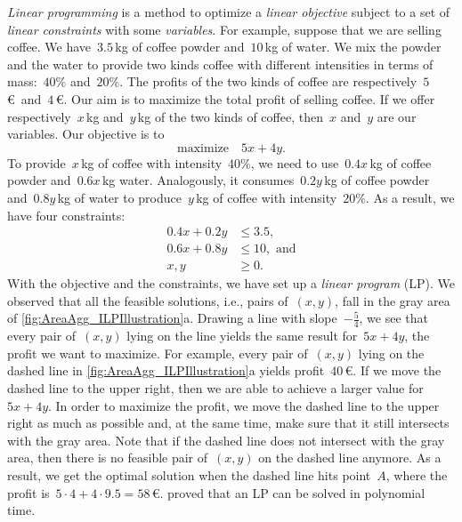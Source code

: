 \emph{Linear programming} is a method 
to optimize a \emph{linear objective}
subject to a set of \emph{linear constraints}
with some \emph{variables}.
For example, suppose that we are selling coffee.
We have~$3.5\,$kg of coffee powder and~$10\,$kg of water.
We mix the powder and the water to provide two kinds coffee 
with different intensities in terms of mass:~$40\%$ and~$20\%$.
The profits of the two kinds of coffee 
are respectively~$5\,$\euro~and~$4\,$\euro.
Our aim is to maximize the total profit of selling coffee.
If we offer respectively~$x\,$kg and~$y\,$kg 
of the two kinds of coffee,
then~$x$ and~$y$ are our variables.
Our objective is to
$$
\mathrm{maximize} 	\quad	 5x+4y.
$$
To provide~$x\,$kg of coffee with intensity~$40\%$,
we need to use~$0.4x\,$kg of coffee powder 
and~$0.6x\,$kg water.
Analogously, it consumes~$0.2y\,$kg of coffee powder 
and~$0.8y\,$kg of water to produce~$y\,$kg of coffee
with intensity~$20\%$.
As a result, we have four constraints:
\begin{align*}
0.4x+0.2y	&\le 3.5,				\\
0.6x+0.8y 	&\le 10,	\text{~and}			\\
x,y			&\ge 0.
\end{align*}
With the objective and the constraints, 
we have set up a \emph{linear program} (LP).
We observed that 
all the feasible solutions, i.e., pairs of~$(x,y)$,
fall in the gray area of
\fig\ref{fig:AreaAgg_ILPIllustration}a.
Drawing a line with slope~$-\frac{5}{4}$,
we see that every pair of~$(x,y)$ lying on the line
yields the same result for~$5x+4y$, 
the profit we want to maximize.
For example, every pair of~$(x,y)$ lying on the dashed line
in \fig\ref{fig:AreaAgg_ILPIllustration}a 
yields profit~$40\,$\euro.
If we move the dashed line to the upper right,
then we are able to achieve a larger value for~$5x+4y$. 
In order to maximize the profit, 
we move the dashed line to the upper right as much as possible
and, at the same time, make sure that 
it still intersects with the gray area.
Note that if the dashed line 
does not intersect with the gray area,
then there is no feasible pair of~$(x,y)$ 
on the dashed line anymore.
As a result, we get the optimal solution 
when the dashed line hits point~$A$,
where the profit is~$5 \cdot 4 + 4 \cdot 9.5 =58\,$\euro.
\textcite{Karmarkar1984LP}
proved that an LP can be solved in polynomial time.

